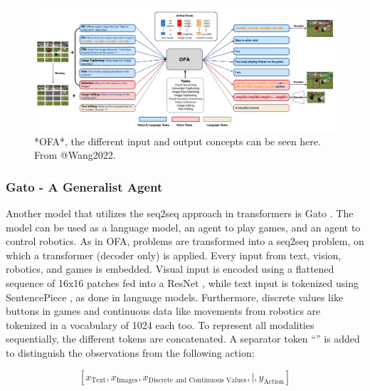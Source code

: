 \documentclass[
]{krantz}
\begin{document}
\begin{figure}

{\centering \includegraphics[width=1\linewidth]{figures/03-03-multipurpose/OFA} 

}

\caption{*OFA*, the different input and output concepts can be seen here. From @Wang2022.}\label{fig:ofa}
\end{figure}

\hypertarget{gato---a-generalist-agent}{%
\subsubsection{Gato - A Generalist Agent}\label{gato---a-generalist-agent}}

Another model that utilizes the seq2seq approach in transformers is Gato \citep{Reed2022}. The model can be used as a language model, an agent to play games, and an agent to control robotics.
As in OFA, problems are transformed into a seq2seq problem, on which a transformer (decoder only) is applied. Every input from text, vision, robotics, and games is embedded. Visual input is encoded using a flattened sequence of 16x16 patches fed into a ResNet \citep{ResNet}, while text input is tokenized using SentencePiece \citep{kudo-richardson-2018-sentencepiece}, as done in language models. Furthermore, discrete values like buttons in games and continuous data like movements from robotics are tokenized in a vocabulary of 1024 each too. To represent all modalities sequentially, the different tokens are concatenated. A separator token ``\textbar{}'' is added to distinguish the observations from the following action:

\[\left [ x_{\textrm{Text}}, x_{\textrm{Images}}, x_{\textrm{Discrete and Continuous Values}}, |, y_{\textrm{Action}} \right ]\]
\end{document}
